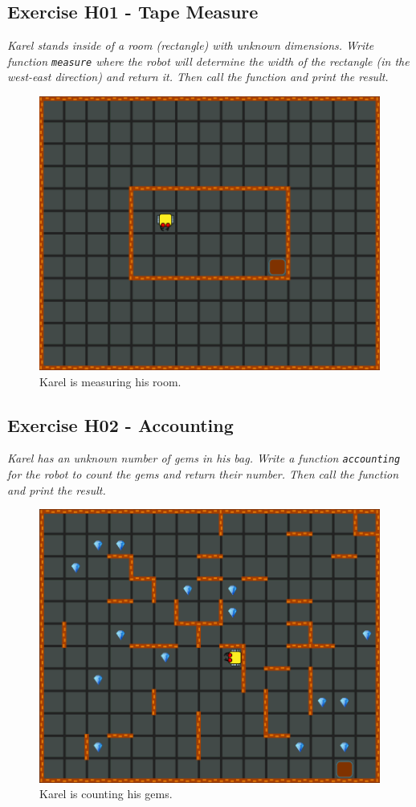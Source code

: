 \documentclass[article,A4,12pt]{llncs}
\begin{document}
{{{{\subsection{Exercise H01 - Tape Measure}

{\em Karel stands inside of a room (rectangle) with unknown dimensions. Write function {\tt measure}  
where the robot will determine the width of the rectangle (in the west-east direction) and return it. 
Then call the function and print the result.}

\begin{figure}[!ht]
\begin{center}
\includegraphics[height=0.4\textwidth]{img/h01.png}
\end{center}
\vspace{-4mm}
\caption{Karel is measuring his room.}
\label{fig:h01}
\vspace{-4mm}
\end{figure}
\noindent

\subsection{Exercise H02 - Accounting}

{\em Karel has an unknown number of gems in his bag. Write a function {\tt accounting} for the 
robot to count the gems and return their number. Then call the function and print the result.}

\begin{figure}[!ht]
\begin{center}
\includegraphics[height=0.4\textwidth]{img/h02.png}
\end{center}
\vspace{-4mm}
\caption{Karel is counting his gems.}
\label{fig:h02}
\vspace{-4mm}
\end{figure}
\noindent

}}}}
\end{document}
